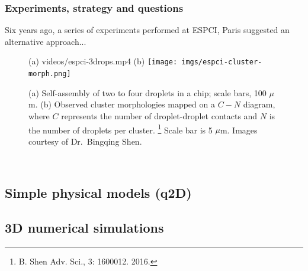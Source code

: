 \begin{frame}
  \frametitle{Experiments, strategy and questions}

  Six years ago, a series of experiments performed at ESPCI, Paris suggested an alternative approach...

  \bigskip
  
  \begin{figure}
    \centering 
    (a)
          {videos/espci-3drops.mp4}
    (b)
    \texttt{[image: imgs/espci-cluster-morph.png]}
    \caption{
      (a) Self-assembly of two to four droplets in a  chip; scale bars, 100 $\mu$m.
      (b) Observed cluster morphologies mapped on a $C-N$ diagram,
      where $C$ represents the number of droplet-droplet contacts and $N$ is the number of droplets per cluster.%
      \footnote{B. Shen \etal Adv. Sci., 3: 1600012. 2016.}
      Scale bar is 5 $\mu$m.
      Images courtesy of Dr.\ Bingqing Shen.}
  \end{figure}
  
  \pause
   \\
  \pause
  
\end{frame}





\hypertarget{dipolar}{%
  \subsection{Simple physical models (q2D)}}

\hypertarget{simulation1}{%
  \subsection{3D numerical simulations}}


